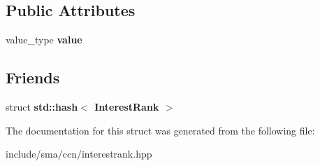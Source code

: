 \subsection*{Public Attributes}
\begin{DoxyCompactItemize}
\item 
\hypertarget{structsma_1_1InterestRank_af8c488e3fba2f04c012cb551623ae3aa}{value\-\_\-type {\bfseries value}}\label{structsma_1_1InterestRank_af8c488e3fba2f04c012cb551623ae3aa}

\end{DoxyCompactItemize}
\subsection*{Friends}
\begin{DoxyCompactItemize}
\item 
\hypertarget{structsma_1_1InterestRank_a9469f1565914e71f0a4934b5ff2495fc}{struct {\bfseries std\-::hash$<$ Interest\-Rank $>$}}\label{structsma_1_1InterestRank_a9469f1565914e71f0a4934b5ff2495fc}

\end{DoxyCompactItemize}


The documentation for this struct was generated from the following file\-:\begin{DoxyCompactItemize}
\item 
include/sma/ccn/interestrank.\-hpp\end{DoxyCompactItemize}
